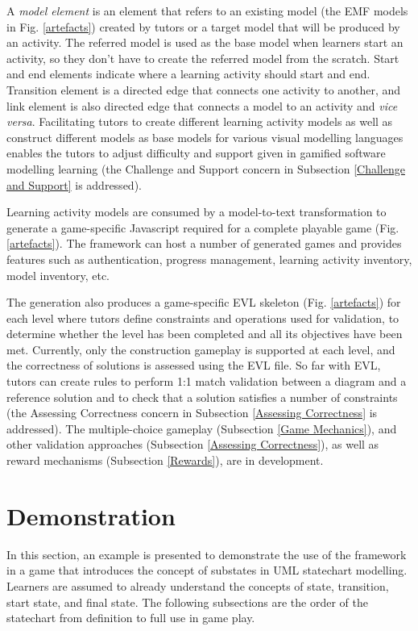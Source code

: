 \documentclass[conference]{IEEEtran}
\begin{document}
A \emph{model element} is an element that refers to an existing model (the EMF models in Fig. \ref{artefacts}) created by tutors or a target model that will be produced by an activity. The referred model is used as the base model when learners start an activity, so they don't have to create the referred model from the scratch. Start and end elements indicate where a learning activity should start and end. Transition element is a directed edge that connects one activity to another, and link element is also directed edge that connects a model to an activity and \textit{vice versa}. Facilitating tutors to create different learning activity models as well as construct different models as base models for various visual modelling languages enables the tutors to adjust difficulty and support given in gamified software modelling learning (the Challenge and Support concern in Subsection \ref{Challenge and Support} is addressed). 

Learning activity models are consumed by a model-to-text transformation to generate a game-specific Javascript required for a complete playable game (Fig. \ref{artefacts}). The framework can host a number of generated games and provides features such as authentication, progress management, learning activity inventory, model inventory, etc.  

The generation also produces a game-specific EVL skeleton (Fig. \ref{artefacts}) for each level where tutors define constraints and operations used for validation, to determine whether the level has been completed and all its objectives have been met. Currently, only the construction gameplay is supported at each level, and the correctness of solutions is assessed using the EVL file. So far with EVL, tutors can create rules to perform 1:1 match validation between a diagram and a reference solution and to check that a solution satisfies a number of constraints (the Assessing Correctness concern in Subsection \ref{Assessing Correctness} is addressed). The multiple-choice gameplay (Subsection \ref{Game Mechanics}), and other validation approaches (Subsection \ref{Assessing Correctness}), as well as reward mechanisms (Subsection \ref{Rewards}), are in development. 

\section{Demonstration}
\label{Demonstration}
In this section, an example is presented to demonstrate the use of the framework in a game that introduces the concept of substates in UML statechart modelling. Learners are assumed to already understand the concepts of state, transition, start state, and final state. The following subsections are the order of the statechart from definition to full use in game play.
 
\end{document}
